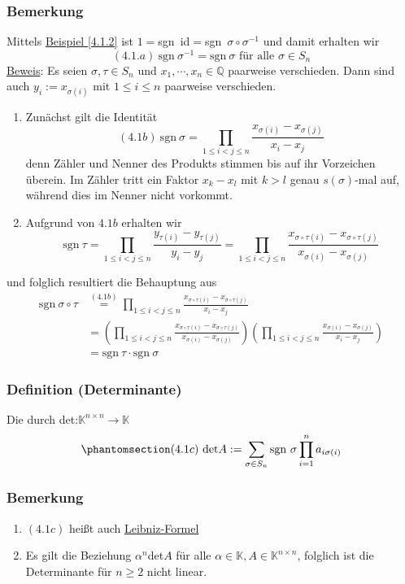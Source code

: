 \subsubsection{Bemerkung}
Mittels \hyperref[4.1.2]{Beispiel \ref*{4.1.2}} ist $1=$sgn~id$=$sgn~$\sigma \circ \sigma ^{-1}$ und damit erhalten wir
\[\label{4.1a} (4.1.a)\ \mathrm{sgn~}\sigma ^{-1}=\mathrm{sgn~}\sigma\text{ für alle }\sigma \in S_n\]
\underline{Beweis}: Es seien $\sigma ,\tau \in S_n$ und $x_1,\cdots ,x_n\in\mathbb{Q}$ paarweise verschieden.  Dann sind auch $y_i:=x_{\sigma (i)}$ mit $1\leq i\leq n$ paarweise verschieden.
\renewcommand{\labelenumi}{(\Roman{enumi})}
\begin{enumerate}
\item Zunächst gilt die Identität
\[\label{4.1b} (4.1b)\ \mathrm{sgn~}\sigma =\prod _{1 \leq i<j \leq n} \frac{x_{\sigma (i)}-x_{\sigma (j)}}{x_i -x_j}\]
denn Zähler und Nenner des Produkts stimmen bis auf ihr Vorzeichen überein.  Im Zähler tritt ein Faktor $x_k -x_l$ mit $k>l$ genau $s(\sigma )$-mal auf, während dies im Nenner nicht vorkommt.
\item Aufgrund von \hyperref[4.1b]{$4.1b$} erhalten wir
\[\mathrm{sgn~}\tau =\prod _{1\leq i<j\leq n} \frac{y_{\tau (i)} -y_{\tau (j)}}{y_i - y_j}=\prod _{1\leq i<j\leq n} \frac{x_{\sigma \circ \tau (i)}-x_{\sigma \circ \tau (j)}}{x_{\sigma (i)}-x_{\sigma (j)}}\]
\end{enumerate}
und folglich resultiert die Behauptung aus
\begin{align*}
\mathrm{sgn~} \sigma\circ\tau &\stackrel{(4.1b)}{=} \prod _{1\leq i<j\leq n}\frac{x_{\sigma \circ \tau (i)}-x_{\sigma\circ\tau (j)}}{x_i -x_j}\\
&= \left(\prod _{1\leq i<j\leq n} \frac{x_{\sigma\circ\tau (i)}-x_{\sigma\circ\tau (j)}}{x_{\sigma (i)}-x_{\sigma (j)}}\right) \left(\prod _{1\leq i<j\leq n}\frac{x_{\sigma (i)}-x_{\sigma (j)}}{x_i-x_j}\right)\\
&= \mathrm{sgn~}\tau \cdot \mathrm{sgn~}\sigma
\end{align*}
\subsubsection{Definition (Determinante)}
Die durch det:$\mathbb{K}^{n\times n}\rightarrow \mathbb{K}$
\[\phantomsection\label{4.1c}(4.1c)\ \mathrm{det}A:=\sum _{\sigma\in S_n} \mathrm{sgn~}\sigma \prod _{i=1}^na_{i\sigma (i)}\]
\subsubsection{Bemerkung}
\renewcommand{\labelenumi}{(\arabic{enumi})}
\begin{enumerate}
\item \hyperref[4.1c]{$(4.1c)$} heißt auch \underline{Leibniz-Formel}
\item Es gilt die Beziehung $\alpha ^n$det$A$ für alle $\alpha\in\mathbb{K},A\in\mathbb{K}^{n\times n}$, folglich ist die Determinante für $n\geq 2$ nicht linear.
\end{enumerate}
